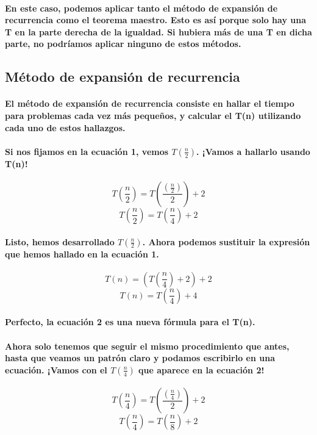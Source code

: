 \documentclass{book}
\begin{document}
      \paragraph{En este caso, podemos aplicar tanto el método de expansión de recurrencia como el teorema maestro. Esto es así porque solo hay una T en la parte derecha de la igualdad. Si hubiera más de una T en dicha parte, no podríamos aplicar ninguno de estos métodos.}
      \subsection{Método de expansión de recurrencia}
      \paragraph{El método de expansión de recurrencia consiste en hallar el tiempo para problemas cada vez más pequeños, y calcular el T(n) utilizando cada uno de estos hallazgos.}
      \paragraph{Si nos fijamos en la ecuación 1, vemos $T(\frac{n}{2})$. ¡Vamos a hallarlo usando T(n)!}
	\begin{equation}	
		T(\frac{n}{2}) = T(\frac{(\frac{n}{2})}{2}) + 2 \nonumber
	\end{equation}	
	\begin{equation}	
		T(\frac{n}{2}) = T(\frac{n}{4}) + 2 \nonumber 
	\end{equation}	
	\paragraph{Listo, hemos desarrollado $T(\frac{n}{2})$. Ahora podemos sustituir la expresión que hemos hallado en la ecuación 1.}
	\begin{equation}	
		T(n) = (T(\frac{n}{4}) + 2) + 2 \nonumber 
	\end{equation}	
	\begin{equation}	
		T(n) = T(\frac{n}{4}) + 4 
	\end{equation}	
	\paragraph{Perfecto, la ecuación 2 es una nueva fórmula para el T(n).}
	\paragraph{Ahora solo tenemos que seguir el mismo procedimiento que antes, hasta que veamos un patrón claro y podamos escribirlo en una ecuación. ¡Vamos con el $T(\frac{n}{4})$ que aparece en la ecuación 2!}
	\begin{equation}	
		T(\frac{n}{4}) = T(\frac{(\frac{n}{4})}{2}) + 2 \nonumber 
	\end{equation}
	\begin{equation}
		T(\frac{n}{4}) = T(\frac{n}{8}) + 2 \nonumber 
	\end{equation}
\end{document}
